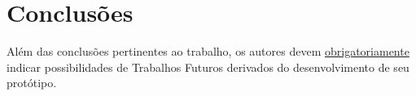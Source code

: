 \chapter{Conclusões}
\label{cap:conclusoes}

Além das conclusões pertinentes ao trabalho, os autores devem \underline{obrigatoriamente} indicar possibilidades de Trabalhos Futuros derivados do desenvolvimento de seu protótipo.